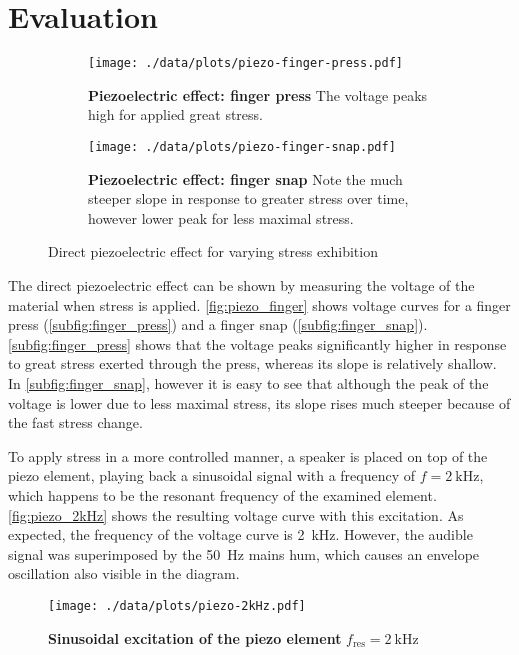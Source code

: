 \section{Evaluation}
\begin{figure}[tbp]
	\centering
	\begin{subfigure}{0.4\textwidth}
		\centering
		\texttt{[image: ./data/plots/piezo-finger-press.pdf]}
		\caption[Piezoelectric effect: finger press]{\textbf{Piezoelectric effect: finger press} The voltage peaks high for applied great stress.}
		\label{subfig:finger_press}
	\end{subfigure}\quad
	\begin{subfigure}{0.4\textwidth}
		\centering
		\texttt{[image: ./data/plots/piezo-finger-snap.pdf]}
		\caption[Piezoelectric effect: finger snap]{\textbf{Piezoelectric effect: finger snap} Note the much steeper slope in response to greater stress over time, however lower peak for less maximal stress.}
		\label{subfig:finger_snap}
	\end{subfigure}
	\caption{Direct piezoelectric effect for varying stress exhibition}
	\label{fig:piezo_finger}
\end{figure}
The direct piezoelectric effect can be shown by measuring the voltage of the material when stress is applied.
\autoref{fig:piezo_finger} shows voltage curves for a finger press (\autoref{subfig:finger_press}) and a finger snap (\autoref{subfig:finger_snap}).
\autoref{subfig:finger_press} shows that the voltage peaks significantly higher in response to great stress exerted through the press, whereas its slope is relatively shallow.
In \autoref{subfig:finger_snap}, however it is easy to see that although the peak of the voltage is lower due to less maximal stress, its slope rises much steeper because of the fast stress change.

To apply stress in a more controlled manner, a speaker is placed on top of the piezo element, playing back a sinusoidal signal with a frequency of $f=\SI{2}{\kilo\hertz}$, which happens to be the resonant frequency of the examined element.
\autoref{fig:piezo_2kHz} shows the resulting voltage curve with this excitation.
As expected, the frequency of the voltage curve is \SI{2}{\kilo\hertz}.
However, the audible signal was superimposed by the \SI{50}{\hertz} mains hum, which causes an  envelope oscillation also visible in the diagram.
\begin{figure}[tbp]
	\centering
	\texttt{[image: ./data/plots/piezo-2kHz.pdf]}
	\caption[Sinusoidal excitation of the piezo element]{\textbf{Sinusoidal excitation of the piezo element} $f_\text{res}=\SI{2}{\kilo\hertz}$}
	\label{fig:piezo_2kHz}
\end{figure}
